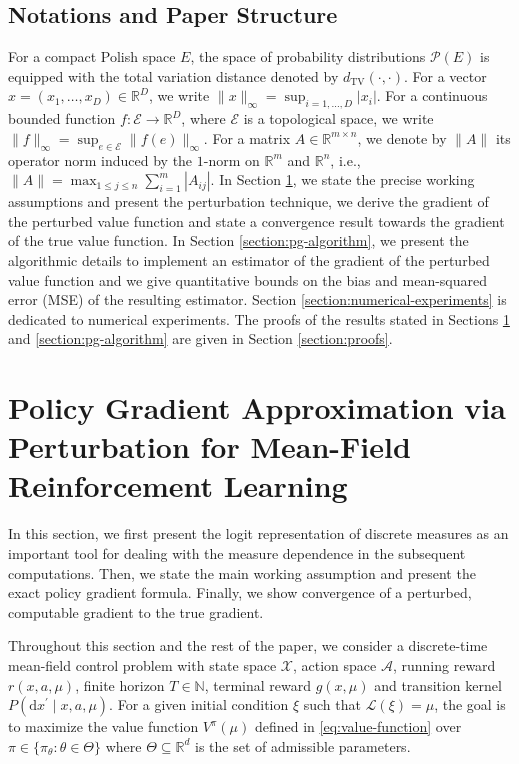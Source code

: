 \documentclass[11pt]{article}
\numberwithin{equation}{section}
\theoremstyle{definition}
\theoremstyle{remark}
\def\tv{\mathrm{TV}}
\def\cA{\mathcal{A}}
\def\cP{\mathcal{P}}
\def\cX{\mathcal{X}}
\def\d{{\mathrm{d}}}
\def\N{{\mathbb{N}}}
\def\R{{\mathbb R}}
\begin{document}
\subsection{Notations and Paper Structure}

For a compact Polish space $E$, the space of probability distributions $\cP (E)$ is equipped with the total variation distance denoted by $d_\tv(\cdot, \cdot)$.
For a vector $x = (x_1, \ldots, x_D) \in \R^D$, we write $\| x \|_{\infty} = \sup_{i =1, \ldots, D } |x_i|$.
For a continuous bounded function $f: \mathcal E \rightarrow \R^D$, where $\mathcal E$ is a topological space, we write $\|f\|_\infty = \sup_{e \in \mathcal E} \| f(e) \|_\infty$.
For a matrix $A \in \R^{m \times n}$, we denote by $\| A \|$ its operator norm induced by the $1$-norm on $\R^m$ and $\R^n$, i.e., $\| A \| = \max_{1 \leq j \leq n } \sum_{i = 1}^m |A_{ij}|$.
In Section \ref{section:pg-mfrl}, we state the precise working assumptions and present the perturbation technique, we derive the gradient of the perturbed value function and state a convergence result towards the gradient of the true value function.
In Section \ref{section:pg-algorithm}, we present the algorithmic details to implement an estimator of the gradient of the perturbed value function and we give quantitative bounds on the bias and mean-squared error (MSE) of the resulting estimator. 
Section \ref{section:numerical-experiments} is dedicated to numerical experiments. The proofs of the results stated in Sections \ref{section:pg-mfrl} and \ref{section:pg-algorithm} are given in Section \ref{section:proofs}.

\section{Policy Gradient Approximation via Perturbation for Mean-Field Reinforcement Learning}
\label{section:pg-mfrl}

In this section, we first present the logit representation of discrete measures as an important tool for dealing with the measure dependence in the subsequent computations. 
Then, we state the main working assumption and present the exact policy gradient formula.
Finally, we show convergence of a perturbed, computable gradient to the true gradient.

Throughout this section and the rest of the paper, we consider a discrete-time mean-field control problem with state space $\cX$, action space $\cA$, running reward $r(x,a,\mu)$, finite horizon $T \in \N$, terminal reward $g(x, \mu)$ and transition kernel $P(\d x^\prime \mid x, a, \mu)$. For a given initial condition $\xi$ such that $\mathcal L (\xi) = \mu$, the goal is to maximize the value function $V^\pi(\mu)$ defined in \eqref{eq:value-function} over $\pi \in \{ \pi_\theta: \theta \in \Theta\}$ where $\Theta \subseteq \R^d$ is the set of admissible parameters.
\end{document}
